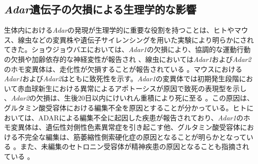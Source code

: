\subsection{\textit{Adar}遺伝子の欠損による生理学的な影響}
生体内における\textit{Adar}の発現が生理学的に重要な役割を持つことは、ヒトやマウス、線虫などの変異株や遺伝子サイレンシングを用いた実験により明らかにされてきた。ショウジョウバエにおいては、\textit{Adar1}の欠損により、協調的な運動行動の欠損や加齢依存的な神経変性が報告され \citep{PalKeeOCo0008}、線虫においては\textit{Adar1}および\textit{Adar2}のホモ変異体は、走化性が欠損することが報告されている \citep{TonSacMor0211}。マウスにおける\textit{Adar1}および\textit{Adar2}はともに致死性を示す。\textit{Adar1}の変異体では初期発生段階において赤血球新生における異常によるアポトーシスが原因で致死の表現型を示し \citep{HarWalLu0901}、\textit{Adar2}の欠損は、生後20日以内にけいれん重積により死に至る \citep{HigMaaSin0007}。この原因は、グルタミン酸受容体における編集不全を原因とすることが分かっている。ヒトにおいては、ADARによる編集不全に起因した疾患が報告されており、\textit{Adar1}のホモ変異体は、遺伝性対側性色素異常症を引き起こす他、グルタミン酸受容体における不完全な編集は、筋萎縮性側索硬化症の原因となることが明らかとなっている \citep{MiySuzKon0309}。また、未編集のセトロニン受容体が精神疾患の原因となることも指摘されている \citep{Slotkin:2013aa}。

